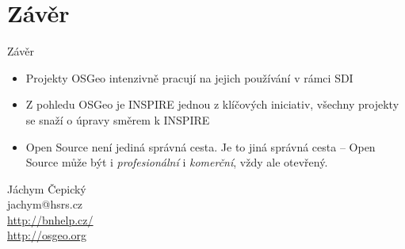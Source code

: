 \documentclass{beamer}
\begin{document}
\section*{Závěr}

\begin{frame}{Závěr}

  \begin{itemize}
  \item
    Projekty OSGeo intenzivně pracují na jejich používání v rámci SDI
  \item
    Z pohledu OSGeo je INSPIRE jednou z klíčových iniciativ, všechny projekty se
    snaží o úpravy směrem k INSPIRE
  \item Open Source není jediná správná cesta. Je to jiná správná cesta --
      Open Source může být i {\em profesionální} i {\em komerční}, vždy ale
      \alert{otevřený}.



  
\end{itemize}
  
\end{frame}


\begin{frame}
    \begin{center}
        Jáchym Čepický \\
        jachym@hsrs.cz \\
        \url{http://bnhelp.cz/} \\
        \url{http://osgeo.org}
    \end{center}
\end{frame}
\end{document}
